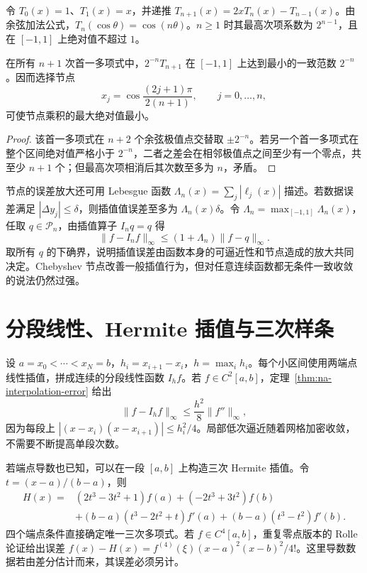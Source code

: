 \documentclass[UTF8,12pt,a4paper,fontset=fandol]{ctexbook}
\begin{document}
\begin{definition}
令 $T_0(x)=1$、$T_1(x)=x$，并递推 $T_{n+1}(x)=2xT_n(x)-T_{n-1}(x)$。由余弦加法公式，$T_n(\cos\theta)=\cos(n\theta)$。$n\ge1$ 时其最高次项系数为 $2^{n-1}$，且在 $[-1,1]$ 上绝对值不超过 $1$。
\end{definition}

\begin{proposition}[节点乘积的极小性质]
在所有 $n+1$ 次首一多项式中，$2^{-n}T_{n+1}$ 在 $[-1,1]$ 上达到最小的一致范数 $2^{-n}$。因而选择节点
\[
 x_j=\cos\frac{(2j+1)\pi}{2(n+1)},\qquad j=0,\ldots,n,
\]
可使节点乘积的最大绝对值最小。
\end{proposition}
\begin{proof}
该首一多项式在 $n+2$ 个余弦极值点交替取 $\pm2^{-n}$。若另一个首一多项式在整个区间绝对值严格小于 $2^{-n}$，二者之差会在相邻极值点之间至少有一个零点，共至少 $n+1$ 个；但最高次项相消后其次数至多为 $n$，矛盾。
\end{proof}

节点的误差放大还可用 Lebesgue 函数 $\Lambda_n(x)=\sum_j|\ell_j(x)|$ 描述。若数据误差满足 $|\Delta y_j|\le\delta$，则插值值误差至多为 $\Lambda_n(x)\delta$。令 $\Lambda_n=\max_{[-1,1]}\Lambda_n(x)$，任取 $q\in\mathcal P_n$，由插值算子 $I_nq=q$ 得
\[
 \|f-I_nf\|_\infty\le(1+\Lambda_n)\|f-q\|_\infty.
\]
取所有 $q$ 的下确界，说明插值误差由函数本身的可逼近性和节点造成的放大共同决定。Chebyshev 节点改善一般插值行为，但对任意连续函数都无条件一致收敛的说法仍然过强。

\section{分段线性、Hermite 插值与三次样条}
设 $a=x_0<\cdots<x_N=b$，$h_i=x_{i+1}-x_i$，$h=\max_i h_i$。每个小区间使用两端点线性插值，拼成连续的分段线性函数 $I_hf$。若 $f\in C^2[a,b]$，定理~\ref{thm:na-interpolation-error} 给出
\[
 \|f-I_hf\|_\infty\le\frac{h^2}{8}\|f''\|_\infty,
\]
因为每段上 $|(x-x_i)(x-x_{i+1})|\le h_i^2/4$。局部低次逼近随着网格加密收敛，不需要不断提高单段次数。

若端点导数也已知，可以在一段 $[a,b]$ 上构造三次 Hermite 插值。令 $t=(x-a)/(b-a)$，则
\begin{align*}
 H(x)={}&(2t^3-3t^2+1)f(a)+(-2t^3+3t^2)f(b)\\
 &+(b-a)(t^3-2t^2+t)f'(a)+(b-a)(t^3-t^2)f'(b).
\end{align*}
四个端点条件直接确定唯一三次多项式。若 $f\in C^4[a,b]$，重复零点版本的 Rolle 论证给出误差 $f(x)-H(x)=f^{(4)}(\xi)(x-a)^2(x-b)^2/4!$。这里导数数据若由差分估计而来，其误差必须另计。
\end{document}
